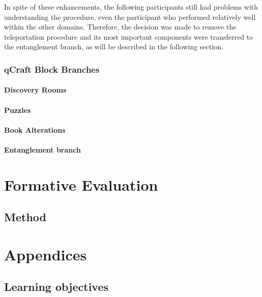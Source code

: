 \documentclass[11pt,twoside]{report} %
\begin{document}
In spite of these enhancements, the following participants still had problems with understanding the procedure, even the participant who performed relatively well within the other domains. Therefore, the decision was made to remove the teleportation procedure and its most important components were transferred to the entanglement branch, as will be described in the following section.

\subsection{qCraft Block Branches}

\subsubsection{Discovery Rooms}

\subsubsection{Puzzles}

\subsubsection{Book Alterations}

\subsubsection{Entanglement branch}


\chapter{Formative Evaluation}
\thispagestyle{fancy}

\section{Method}
\label{sec:methodevaluation}




\chapter{Appendices}

\appendix

\section{Learning objectives}
\label{app:learningobjectives}
\end{document}

